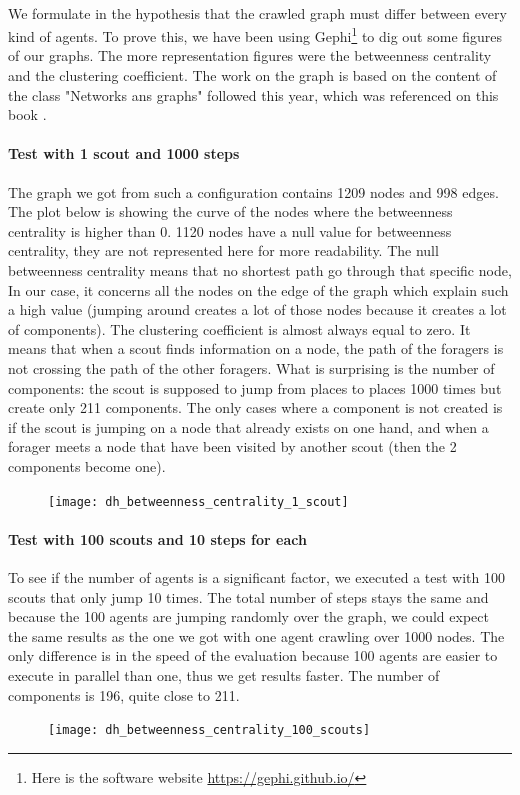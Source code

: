 \documentclass{article}
\begin{document}
		\paragraph{}
			We formulate in the hypothesis that the crawled graph must differ between every kind of agents.
			To prove this, we have been using Gephi\footnote{
			Here is the software website \url{https://gephi.github.io/}
			} to dig out some figures of our graphs.
			The more representation figures were the betweenness centrality and the clustering coefficient.
			The work on the graph is based on the content of the class "Networks ans graphs" followed this year,
			which was referenced on this book \cite{Steen10}.
		\paragraph{Test with 1 scout and 1000 steps}
			The graph we got from such a configuration contains 1209 nodes and 998 edges.
			The plot below is showing the curve of the nodes where the betweenness centrality is higher than 0.
			1120 nodes have a null value for betweenness centrality, they are not represented here for more readability.
			The null betweenness centrality means that no shortest path go through that specific node,
			In our case, it concerns all the nodes on the edge of the graph which explain such a high value
			(jumping around creates a lot of those nodes because it creates a lot of components).
			The clustering coefficient is almost always equal to zero.
			It means that when a scout finds information on a node, the path of the foragers is not crossing the path of the other foragers.
			What is surprising is the number of components: the scout is supposed to jump from places to places 1000 times
			but create only 211 components.
			The only cases where a component is not created is if the scout is jumping on a node that already exists on one hand,
			and when a forager meets a node that have been visited by another scout (then the 2 components become one).
		\begin{figure}[!h]
			\texttt{[image: dh\_betweenness\_centrality\_1\_scout]}
		\end{figure}
		\paragraph{Test with 100 scouts and 10 steps for each}
			To see if the number of agents is a significant factor, we executed a test with 100 scouts that only jump 10 times.
			The total number of steps stays the same and because the 100 agents are jumping randomly over the graph,
			we could expect the same results as the one we got with one agent crawling over 1000 nodes.
			The only difference is in the speed of the evaluation because 100 agents are easier to execute in parallel than one,
			thus we get results faster.
			The number of components is 196, quite close to 211.
		\begin{figure}[!h]
			\texttt{[image: dh\_betweenness\_centrality\_100\_scouts]}
		\end{figure}
\end{document}
